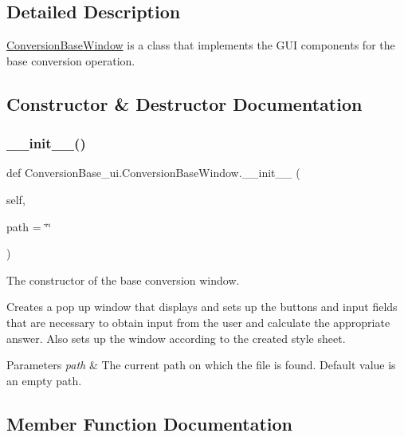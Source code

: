 \subsection{Detailed Description}
\hyperlink{class_conversion_base__ui_1_1_conversion_base_window}{Conversion\+Base\+Window} is a class that implements the G\+UI components for the base conversion operation. 

\subsection{Constructor \& Destructor Documentation}
\mbox{\label{class_conversion_base__ui_1_1_conversion_base_window_af8fe79c29cebc3c67c6260fe661872da}} 
\subsubsection{\texorpdfstring{\+\_\+\+\_\+init\+\_\+\+\_\+()}{\_\_init\_\_()}}
{\footnotesize\ttfamily def Conversion\+Base\+\_\+ui.\+Conversion\+Base\+Window.\+\_\+\+\_\+init\+\_\+\+\_\+ (\begin{DoxyParamCaption}\item[{}]{self,  }\item[{}]{path = {\ttfamily \char`\"{}\char`\"{}} }\end{DoxyParamCaption})}



The constructor of the base conversion window. 

Creates a pop up window that displays and sets up the buttons and input fields that are necessary to obtain input from the user and calculate the appropriate answer. Also sets up the window according to the created style sheet. 
\begin{DoxyParams}{Parameters}
{\em path} & The current path on which the file is found. Default value is an empty path. \\
\hline
\end{DoxyParams}


\subsection{Member Function Documentation}
\mbox{\label{class_conversion_base__ui_1_1_conversion_base_window_af4bcf9d2cda570924af0efe9302f1c92}} 
